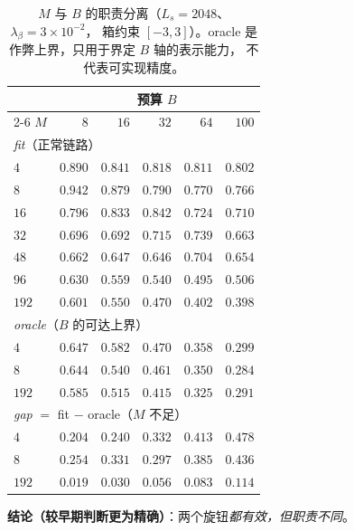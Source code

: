 \begin{table}[t]
  \centering
  \footnotesize
  \setlength{\tabcolsep}{2.5pt}
  \begin{tabular}{lrrrrr}
    \toprule
    & \multicolumn{5}{c}{预算 $B$} \\
    \cmidrule(lr){2-6}
    $M$ & $8$ & $16$ & $32$ & $64$ & $100$ \\
    \midrule
    \multicolumn{6}{l}{\emph{fit}（正常链路）} \\
    $4$  & $0.890$ & $0.841$ & $0.818$ & $0.811$ & $0.802$ \\
    $8$  & $0.942$ & $0.879$ & $0.790$ & $0.770$ & $0.766$ \\
    $16$ & $0.796$ & $0.833$ & $0.842$ & $0.724$ & $0.710$ \\
    $32$ & $0.696$ & $0.692$ & $0.715$ & $0.739$ & $0.663$ \\
    $48$ & $0.662$ & $0.647$ & $0.646$ & $0.704$ & $0.654$ \\
    $96$ & $0.630$ & $0.559$ & $0.540$ & $0.495$ & $0.506$ \\
    $192$ & $0.601$ & $0.550$ & $0.470$ & $0.402$ & $0.398$ \\
    \midrule
    \multicolumn{6}{l}{\emph{oracle}（$B$ 的可达上界）} \\
    $4$  & $0.647$ & $0.582$ & $0.470$ & $0.358$ & $0.299$ \\
    $8$  & $0.644$ & $0.540$ & $0.461$ & $0.350$ & $0.284$ \\
    $192$ & $0.585$ & $0.515$ & $0.415$ & $0.325$ & $0.291$ \\
    \midrule
    \multicolumn{6}{l}{\emph{gap} $=$ fit $-$ oracle（$M$ 不足）} \\
    $4$  & $0.204$ & $0.240$ & $0.332$ & $0.413$ & $0.478$ \\
    $8$  & $0.254$ & $0.331$ & $0.297$ & $0.385$ & $0.436$ \\
    $192$ & $0.019$ & $0.030$ & $0.056$ & $0.083$ & $0.114$ \\
    \bottomrule
  \end{tabular}
  \caption{$M$ 与 $B$ 的职责分离（$L_s=2048$、$\lambda_\beta=3\times10^{-2}$，
  箱约束 $[-3,3]$）。oracle 是作弊上界，只用于界定 $B$ 轴的表示能力，
  不代表可实现精度。}
  \label{tab:knob}
\end{table}

\textbf{结论（较早期判断更为精确）}：两个旋钮\emph{都有效，但职责不同}。

